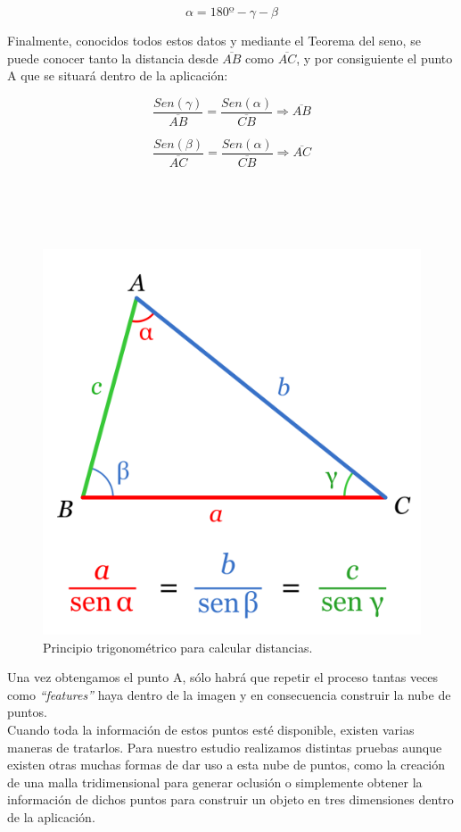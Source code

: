 $$\alpha=180º-\gamma-\beta$$

Finalmente, conocidos todos estos datos y mediante el Teorema del seno, se puede conocer tanto la distancia desde $\overline{AB}$ como $\overline{AC}$, y por consiguiente el punto A que se situará dentro de la aplicación:

$$\frac{Sen(\gamma)}{\overline{AB}}=\frac{Sen(\alpha)}{\overline{CB}} \Rightarrow \overline{AB} $$ 

$$\frac{Sen(\beta)}{\overline{AC}}=\frac{Sen(\alpha)}{\overline{CB}} \Rightarrow \overline{AC} $$ \\ \\ \\ \\

\begin{figure}[h]
    \centering
    \includegraphics[scale=0.15]{Images/NubeDePuntos/Trigonometria.png}
    \caption[Principio trigonométrico para calcular distancias]{Principio trigonométrico para calcular distancias.}
    \label{fig:Trigonometry}
\end{figure}

Una vez obtengamos el punto A, sólo habrá que repetir el proceso tantas veces como \textit{``features''} haya dentro de la imagen y en consecuencia construir la nube de puntos. \\

Cuando toda la información de estos puntos esté disponible, existen varias maneras de tratarlos. Para nuestro estudio realizamos distintas pruebas aunque existen otras muchas formas de dar uso a esta nube de puntos, como la creación de una malla tridimensional para generar oclusión o simplemente obtener la información de dichos puntos para construir un objeto en tres dimensiones dentro de la aplicación.